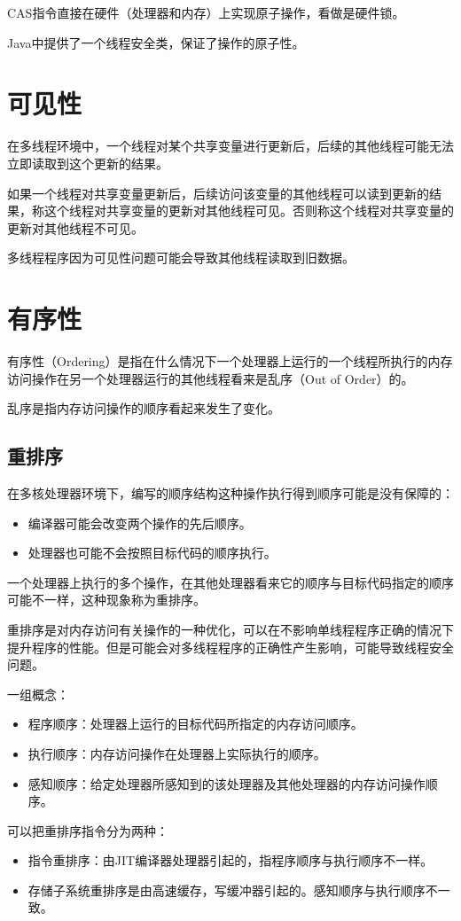 \documentclass[a4paper]{report}
\begin{document}
CAS指令直接在硬件（处理器和内存）上实现原子操作，看做是硬件锁。

Java中提供了一个线程安全类，保证了操作的原子性。
\section{可见性}
在多线程环境中，一个线程对某个共享变量进行更新后，后续的其他线程可能无法立即读取到这个更新的结果。

如果一个线程对共享变量更新后，后续访问该变量的其他线程可以读到更新的结果，称这个线程对共享变量的更新对其他线程可见。否则称这个线程对共享变量的更新对其他线程不可见。

多线程程序因为可见性问题可能会导致其他线程读取到旧数据。
\section{有序性}
有序性（Ordering）是指在什么情况下一个处理器上运行的一个线程所执行的内存访问操作在另一个处理器运行的其他线程看来是乱序（Out of Order）的。

乱序是指内存访问操作的顺序看起来发生了变化。
\subsection{重排序}
在多核处理器环境下，编写的顺序结构这种操作执行得到顺序可能是没有保障的：
\begin{itemize}
  \item 编译器可能会改变两个操作的先后顺序。
  \item 处理器也可能不会按照目标代码的顺序执行。
\end{itemize}

一个处理器上执行的多个操作，在其他处理器看来它的顺序与目标代码指定的顺序可能不一样，这种现象称为重排序。

重排序是对内存访问有关操作的一种优化，可以在不影响单线程程序正确的情况下提升程序的性能。但是可能会对多线程程序的正确性产生影响，可能导致线程安全问题。

一组概念：
\begin{itemize}
  \item 程序顺序：处理器上运行的目标代码所指定的内存访问顺序。
  \item 执行顺序：内存访问操作在处理器上实际执行的顺序。
  \item 感知顺序：给定处理器所感知到的该处理器及其他处理器的内存访问操作顺序。
\end{itemize}

可以把重排序指令分为两种：
\begin{itemize}
  \item 指令重排序：由JIT编译器处理器引起的，指程序顺序与执行顺序不一样。
  \item 存储子系统重排序是由高速缓存，写缓冲器引起的。感知顺序与执行顺序不一致。
\end{itemize}
\end{document}
